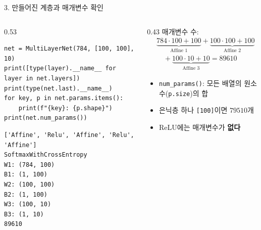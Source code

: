 \documentclass[aspectratio=169,11pt]{beamer}
\newcommand{\code}[1]{\texttt{#1}}
\begin{document}
\begin{frame}[fragile]{3. 만들어진 계층과 매개변수 확인}
\begin{columns}[T,onlytextwidth]
\begin{column}{0.53\textwidth}
\begin{lstlisting}
net = MultiLayerNet(784, [100, 100], 10)
print([type(layer).__name__ for layer in net.layers])
print(type(net.last).__name__)
for key, p in net.params.items():
    print(f"{key}: {p.shape}")
print(net.num_params())
\end{lstlisting}
\begin{lstlisting}[style=outstyle]
['Affine', 'Relu', 'Affine', 'Relu', 'Affine']
SoftmaxWithCrossEntropy
W1: (784, 100)
B1: (1, 100)
W2: (100, 100)
B2: (1, 100)
W3: (100, 10)
B3: (1, 10)
89610
\end{lstlisting}
\end{column}
\begin{column}{0.43\textwidth}
\small
매개변수 수:
\[
\begin{aligned}
&\underbrace{784\cdot100+100}_{\text{Affine 1}}
+\underbrace{100\cdot100+100}_{\text{Affine 2}}\\
&\quad+\underbrace{100\cdot10+10}_{\text{Affine 3}}=89610
\end{aligned}
\]
\begin{itemize}
\item \code{num\_params()}: 모든 배열의 원소 수(\code{p.size})의 합
\item 은닉층 하나 \code{[100]}이면 $79510$개
\item ReLU에는 매개변수가 \textbf{없다}
\end{itemize}
\end{column}
\end{columns}
\end{frame}
\end{document}
